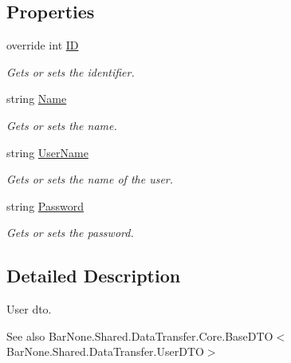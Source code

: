 \subsection*{Properties}
\begin{DoxyCompactItemize}
\item 
override int \mbox{\hyperlink{class_bar_none_1_1_shared_1_1_data_transfer_1_1_user_d_t_o_a87f7188d5d756a7c59ae4b1ece95f938}{ID}}
\begin{DoxyCompactList}\small\item\em Gets or sets the identifier. \end{DoxyCompactList}\item 
string \mbox{\hyperlink{class_bar_none_1_1_shared_1_1_data_transfer_1_1_user_d_t_o_a3c71d103b026292bc8159ac83536e88a}{Name}}
\begin{DoxyCompactList}\small\item\em Gets or sets the name. \end{DoxyCompactList}\item 
string \mbox{\hyperlink{class_bar_none_1_1_shared_1_1_data_transfer_1_1_user_d_t_o_a7775f156796d3bc16915c045d25a0ae7}{User\+Name}}
\begin{DoxyCompactList}\small\item\em Gets or sets the name of the user. \end{DoxyCompactList}\item 
string \mbox{\hyperlink{class_bar_none_1_1_shared_1_1_data_transfer_1_1_user_d_t_o_a45d4a8512f0906cd90c5ebc6718a7053}{Password}}
\begin{DoxyCompactList}\small\item\em Gets or sets the password. \end{DoxyCompactList}\end{DoxyCompactItemize}


\subsection{Detailed Description}
User dto. 

\begin{DoxySeeAlso}{See also}
Bar\+None.\+Shared.\+Data\+Transfer.\+Core.\+Base\+D\+T\+O$<$\+Bar\+None.\+Shared.\+Data\+Transfer.\+User\+D\+T\+O$>$


\end{DoxySeeAlso}



